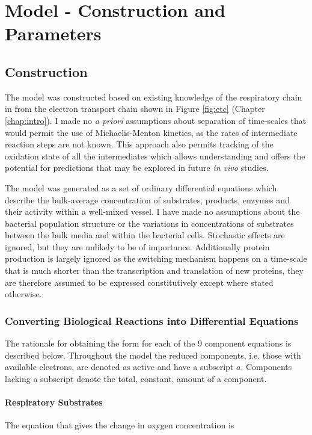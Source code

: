 \chapter{Model - Construction and Parameters}
\label{chap:model}
\section{Construction}

The model was constructed based on existing knowledge of the respiratory chain in \Nsm{} from the electron transport chain shown in Figure \ref{fig:etc} (Chapter \ref{chap:intro}). I made no \textit{a priori} assumptions about separation of time-scales that would permit the use of Michaelis-Menton kinetics, as the rates of intermediate reaction steps are not known. This approach also permits tracking of the oxidation state of all the intermediates which allows understanding and offers the potential for predictions that may be explored in future \textit{in vivo} studies.

The model was generated as a set of ordinary differential equations which describe the bulk-average concentration of substrates, products, enzymes and their activity within a well-mixed vessel. I have made no assumptions about the bacterial population structure or the variations in concentrations of substrates between the bulk media and within the bacterial cells. Stochastic effects are ignored, but they are unlikely to be of importance. Additionally protein production is largely ignored as the switching mechanism happens on a time-scale that is much shorter than the transcription and translation of new proteins, they are therefore assumed to be expressed constitutively except where stated otherwise.

\subsection{Converting Biological Reactions into Differential Equations}
The rationale for obtaining the form for each of the 9 component equations is described below. Throughout the model the reduced components, i.e. those with available electrons, are denoted as active and have a subscript $a$. Components lacking a subscript denote the total, constant, amount of a component.

\subsubsection{Respiratory Substrates}
The equation that gives the change in oxygen concentration is

